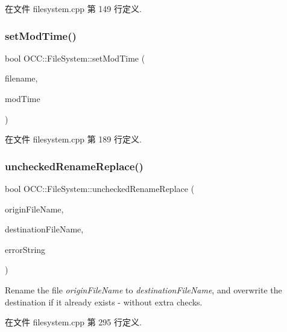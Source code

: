 在文件 filesystem.\+cpp 第 149 行定义.

\mbox{\label{namespace_o_c_c_1_1_file_system_a1f35d1664358d204ec7357adfa91f7da}} 
\subsubsection{\texorpdfstring{set\+Mod\+Time()}{setModTime()}}
{\footnotesize\ttfamily bool O\+C\+C\+::\+File\+System\+::set\+Mod\+Time (\begin{DoxyParamCaption}\item[{const Q\+String \&}]{filename,  }\item[{time\+\_\+t}]{mod\+Time }\end{DoxyParamCaption})}



在文件 filesystem.\+cpp 第 189 行定义.

\mbox{\label{namespace_o_c_c_1_1_file_system_ad04aec9abd9b4602dc0bddba125c320c}} 
\subsubsection{\texorpdfstring{unchecked\+Rename\+Replace()}{uncheckedRenameReplace()}}
{\footnotesize\ttfamily bool O\+C\+C\+::\+File\+System\+::unchecked\+Rename\+Replace (\begin{DoxyParamCaption}\item[{const Q\+String \&}]{origin\+File\+Name,  }\item[{const Q\+String \&}]{destination\+File\+Name,  }\item[{Q\+String $\ast$}]{error\+String }\end{DoxyParamCaption})}

Rename the file {\itshape origin\+File\+Name} to {\itshape destination\+File\+Name}, and overwrite the destination if it already exists -\/ without extra checks. 

在文件 filesystem.\+cpp 第 295 行定义.

